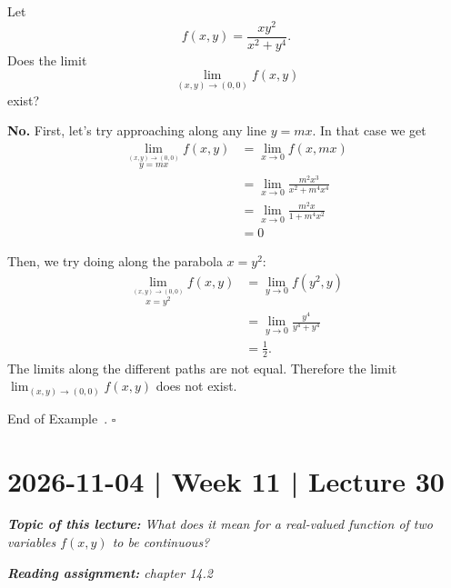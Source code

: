 \documentclass[10pt]{article}
\theoremstyle{definition}
\newtheorem{example}[theorem]{Example}
\renewenvironment{example}
{\begin{oldexample}}
  {\par\smallskip\hfill   End of Example~\theexample. $\square$    \par\end{oldexample}}
\newcommand{\vt}{\vskip 5mm} %
\newcommand{\Fl}{\vt\noindent\textbf} %
\newcommand{\1}[1]{\textbf{1}_{\left[#1\right]}} %
\begin{document}
\begin{example}
  Let
  \begin{equation*}
    f(x,y) = \frac{xy^{2}}{x^{2}+y^{4}}.
  \end{equation*}
  Does the limit
  \begin{equation*}
    \lim_{(x,y)\to (0,0)}f(x,y)
  \end{equation*}
  exist?
  
  \Fl{No.} First, let's try approaching along any line $y = mx$. In that case
  we get
  \begin{align*}
    \lim_{\overset{(x,y)\to (0,0)}{y=mx}}f(x,y) 
    &= \lim_{x \to 0} f(x,mx) \\
    &= \lim_{x \to 0} \frac{m^{2}x^{3}  }{x^{2}+m^{4}x^{4}} \\
    &= \lim_{x \to 0} \frac{m^{2}x  }{1+m^{4}x^{2}} \\
    &= 0
  \end{align*}

  Then, we try doing along the parabola $x=y^{2}$:
  \begin{align*}
    \lim_{\overset{(x,y)\to (0,0)}{x=y^{2}}}f(x,y)
    &=\lim_{y \to 0}f(y^{2},y)\\
    &=\lim_{y \to 0}\frac{y^{4}}{y^{4}+y^{4}}\\
    &=\frac{1}{2}.
  \end{align*}
  The limits along the different paths are not equal. Therefore the limit
  $\lim_{(x,y)\to (0,0)}f(x,y)$ does not exist.
\end{example}
\newpage
\section{2026-11-04 | Week 11 | Lecture 30}
\begin{center}
  \begin{tcolorbox}[width=0.9\textwidth, colback=white, colframe=black]
    \textit{\textbf{Topic of this lecture:} What does it mean for a
      real-valued function of two variables $f(x,y)$ to be continuous?}

    \textit{\textbf{Reading assignment:} chapter 14.2}
  \end{tcolorbox}
\end{center}

\end{document}
